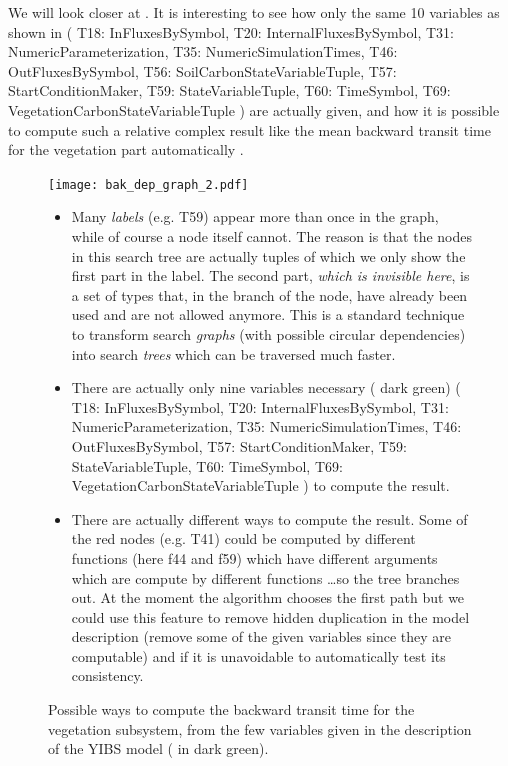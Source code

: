 We will look closer at  
  . It is interesting to see how only the same 10 variables 
  as shown in  
      (
          T18: InFluxesBySymbol, 
        	T20: InternalFluxesBySymbol, 
        	T31: NumericParameterization, 
        	T35: NumericSimulationTimes, 
        	T46: OutFluxesBySymbol, 
        	T56: SoilCarbonStateVariableTuple, 
        	T57: StartConditionMaker, 
        	T59: StateVariableTuple, 
        	T60: TimeSymbol, 
        	T69: VegetationCarbonStateVariableTuple
      )
  are actually given,
  and how it is possible to compute such a relative complex result
  like the mean backward transit time for the vegetation part automatically
  .
\begin{figure}[ht]
	\texttt{[image: bak\_dep\_graph\_2.pdf]}
    \caption{
      Possible ways to compute the backward transit time for the vegetation
      subsystem, from the few variables given in the description of the YIBS
      model ( in dark green).
    }
    \begin{itemize}
      \item
      Many \emph{labels} (e.g. T59)  appear more than once in the graph, while of
        course a node itself cannot.  The reason is that the nodes in this
        search tree are actually tuples of which we only show the first part in
        the label. The second part, \emph{which is invisible here}, is a set of
        types that, in the branch of the node, have already been used and are not
        allowed anymore.  This is a standard technique to transform search
        \emph{graphs} (with possible circular dependencies) into search
        \emph{trees} which can be traversed much faster.
      \item
        There are actually only nine variables necessary ( dark green)
        (
          T18: InFluxesBySymbol, 
        	T20: InternalFluxesBySymbol, 
        	T31: NumericParameterization, 
        	T35: NumericSimulationTimes, 
        	T46: OutFluxesBySymbol, 
        	T57: StartConditionMaker, 
        	T59: StateVariableTuple, 
        	T60: TimeSymbol, 
        	T69: VegetationCarbonStateVariableTuple
       ) to compute the result.
      \item
        There are actually different ways to compute the result. Some of the red nodes (e.g. T41)         could be computed by different functions (here f44 and f59)  which have different arguments which are compute by different functions \dots so the tree branches out. 
        At the moment the algorithm chooses the first path but we could use this feature to
        remove hidden duplication in the model description (remove some of the given variables since they are computable) and 
        if it is unavoidable to automatically test its consistency. 
    \end{itemize}
  \label{fig:dep_graph_2}
\end{figure}
